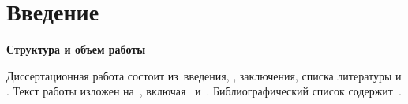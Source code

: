 
\chapter*{Введение}                         

\newcommand{\actuality}{\textbf{\actualityTXT}}
\newcommand{\progress}{\textbf{\progressTXT}}
\newcommand{\aim}{{\textbf\aimTXT}}
\newcommand{\tasks}{\textbf{\tasksTXT}}
\newcommand{\novelty}{\textbf{\noveltyTXT}}
\newcommand{\influence}{\textbf{\influenceTXT}}
\newcommand{\methods}{\textbf{\methodsTXT}}
\newcommand{\defpositions}{\textbf{\defpositionsTXT}}
\newcommand{\reliability}{\textbf{\reliabilityTXT}}
\newcommand{\probation}{\textbf{\probationTXT}}
\newcommand{\contribution}{\textbf{\contributionTXT}}
\newcommand{\pasport}{\textbf{\pasportTXT}}
\newcommand{\publications}{\textbf{\publicationsTXT}}

 

\textbf{Структура и объем работы} 

Диссертационная работа состоит из~введения, , заключения, списка литературы и . Текст работы изложен на~, включая~ и~. Библиографический список содержит~.